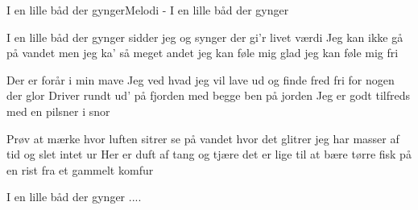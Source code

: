 \begin{sang}{I en lille båd der gynger}{Melodi - I en lille båd der gynger}
\begin{vers}
I en lille båd der gynger
sidder jeg og synger
der gi'r livet værdi
Jeg kan ikke gå på vandet
men jeg ka' så meget andet
jeg kan føle mig glad
jeg kan føle mig fri
\end{vers}
\begin{vers}
Der er forår i min mave
Jeg ved hvad jeg vil lave
ud og finde fred
fri for nogen der glor
Driver rundt ud' på fjorden
med begge ben på jorden
Jeg er godt tilfreds
med en pilsner i snor
\end{vers}
\vfill
\begin{vers}
Prøv at mærke hvor luften sitrer
se på vandet hvor det glitrer
jeg har masser af tid
og slet intet ur
Her er duft af tang og tjære
det er lige til at bære
tørre fisk på en rist fra et gammelt komfur
\end{vers}
\begin{vers}
I en lille båd der gynger ....
\end{vers}
\laps
\end{sang}